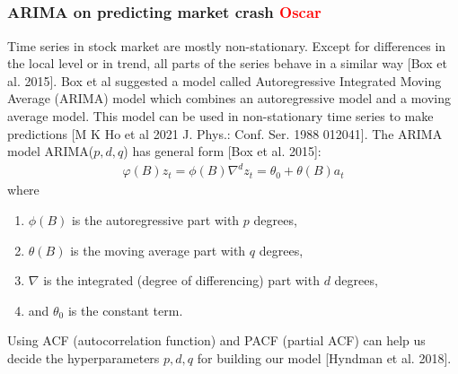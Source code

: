\documentclass[12pt, letterpaper]{article}
\begin{document}





\subparagraph*{}
    \subsubsection*{ARIMA on predicting market crash \textcolor{red}{Oscar}}
    Time series in stock market are mostly non-stationary. Except for differences in the local level or in trend, all parts of the series behave in a similar way [Box et al. 2015]. Box et al suggested a model called Autoregressive Integrated Moving Average (ARIMA) model which combines an autoregressive model and a moving average model. This model can be used in non-stationary time series to make predictions [M K Ho et al 2021 J. Phys.: Conf. Ser. 1988 012041].
    The ARIMA model ARIMA($p,d,q$) has general form [Box et al. 2015]:
    \begin{align*}
        \varphi (B) z_t = \phi (B)\nabla^d z_t = \theta_0 + \theta (B)a_t
    \end{align*}
    where
    \begin{enumerate}[label=\arabic*.]
        \item $\phi(B)$ is the autoregressive part with $p$ degrees,
        \item $\theta (B)$ is the moving average part with $q$ degrees,
        \item $\nabla$ is the integrated (degree of differencing) part with $d$ degrees,
        \item and $\theta_0$ is the constant term.
    \end{enumerate}
    Using ACF (autocorrelation function) and PACF (partial ACF) can help us decide the hyperparameters $p, d, q$ for building our model [Hyndman et al. 2018].
\end{document}
